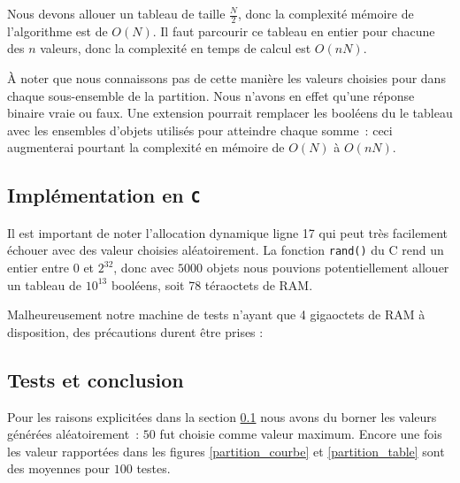 Nous devons allouer un tableau de taille $\frac{N}{2}$, donc la
complexité mémoire de l'algorithme est de $O(N)$. Il faut parcourir ce
tableau en entier pour chacune des $n$ valeurs, donc la complexité en
temps de calcul est $O(nN)$.

À noter que nous connaissons pas de cette manière les valeurs choisies pour dans chaque sous-ensemble de la partition. Nous n'avons en effet qu'une réponse binaire vraie ou faux. Une extension pourrait remplacer les booléens du le tableau avec les ensembles d'objets utilisés pour atteindre chaque somme~: ceci augmenterai pourtant la complexité en mémoire de $O(N)$ à $O(nN)$.

\subsection{Implémentation en \texttt{C}}
\label{implementation_c}
Il est important de noter l'allocation dynamique ligne 17 qui peut
très facilement échouer avec des valeur choisies aléatoirement. La
fonction \texttt{rand()} du C rend un entier entre $0$ et $2^{32}$,
donc avec $5000$ objets nous pouvions potentiellement allouer un
tableau de $10^{13}$ booléens, soit 78 téraoctets de RAM.

Malheureusement notre machine de tests n'ayant que 4 gigaoctets de RAM
à disposition, des précautions durent être prises :

\vspace{0.5cm}

 

\subsection{Tests et conclusion}

Pour les raisons explicitées dans la section \ref{implementation_c}
nous avons du borner les valeurs générées aléatoirement~: $50$ fut
choisie comme valeur maximum. Encore une fois les valeur rapportées
dans les figures \ref{partition_courbe} et \ref{partition_table} sont
des moyennes pour $100$ testes.

